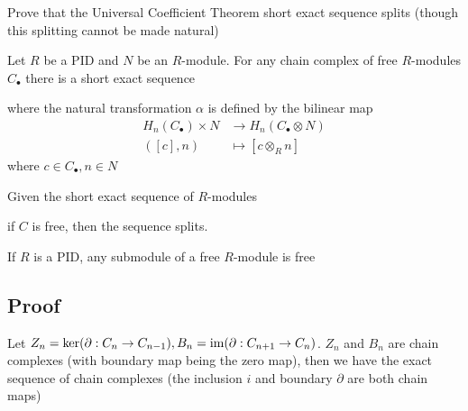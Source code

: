 \documentclass{article}
\begin{document}
Prove that the Universal Coefficient Theorem short exact sequence splits (though this splitting cannot be made natural)

\begin{theorem}
    Let $R$ be a PID and $N$ be an $R$-module. For any chain complex of free $R$-modules $C_\bullet$ there is a short exact sequence
    \begin{center}
    \end{center}
    where the natural transformation $\alpha$ is defined by the bilinear map
    \begin{align*}
        H_n(C_\bullet) \times N &\to H_n(C_\bullet \otimes N) \\
        ([c], n) &\mapsto [c \otimes_R n]
    \end{align*}
    where $c \in C_\bullet, n \in N$
\end{theorem}

\begin{lemma}
    \label{lemma3}
    Given the short exact sequence of $R$-modules
    \begin{center}
    \end{center}
    if $C$ is free, then the sequence splits.
\end{lemma}

\begin{lemma}
    \label{lemma4}
    If $R$ is a PID, any submodule of a free $R$-module is free
\end{lemma}

\subsection{Proof}

Let $Z_n = \ker (\partial: C_n \to C_{n-1}), B_n = \operatorname{im} (\partial: C_{n+1} \to C_n)$. $Z_n$ and $B_n$ are chain complexes (with boundary map being the zero map), then we have the exact sequence of chain complexes (the inclusion $i$ and boundary $\partial$ are both chain maps)
\end{document}

